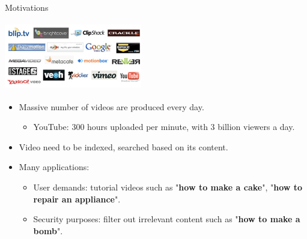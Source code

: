 \documentclass{beamer}
\begin{document}
\begin{frame}[t]{Motivations}
\begin{center}
\includegraphics[width=6cm,height=3cm]{images/MED_overview.png}
\end{center}
\begin{itemize}
\item Massive number of videos are produced every day. 
\begin{itemize}
\item YouTube: 300 hours uploaded per minute, with 3 billion viewers a day.
\end{itemize}
\item Video need to be indexed, searched based on its content.
\item Many applications: 
\begin{itemize}
\item User demands: tutorial videos such as "\textbf{how to make a cake}", "\textbf{how to repair an appliance}".
\item Security purposes: filter out irrelevant content such as "\textbf{how to make a bomb}".

\end{itemize}

\end{itemize}
\end{frame}


\end{document}
